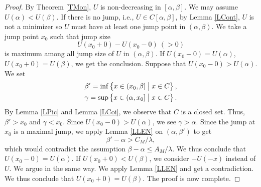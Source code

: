 \documentclass[11pt]{amsart} %
\numberwithin{equation}{section}
\begin{document}
\begin{proof}
By Theorem \ref{TMon}, $U$ is non-decreasing in $[\alpha,\beta]$.
 We may assume $U(\alpha)<U(\beta)$.
 If there is no jump, i.e., $U\in C[\alpha,\beta]$, by Lemma \ref{LCont}, $U$ is not a minimizer so $U$ must have at least one jump point in $(\alpha,\beta)$.
 We take a jump point $x_0$ such that jump size
\[
	U(x_0+0) - U(x_0-0)\ (>0)
\]
is maximum among all jump size of $U$ in $(\alpha,\beta)$.
 If $U(x_0-0)=U(\alpha)$, $U(x_0+0)=U(\beta)$, we get the conclusion.
 Suppose that $U(x_0-0)>U(\alpha)$.
 We set
\begin{gather*} %
	\beta' = \inf \left\{ x \in (x_0,\beta] \bigm| x \in C \right\}, \\
	\gamma = \sup \left\{ x \in (\alpha,x_0] \bigm| x \in C \right\}.
\end{gather*}
By Lemma \ref{LPic} and Lemma \ref{LCoi}, we observe that $C$ is a closed set.
 Thus, $\beta'>x_0$ and $\gamma<x_0$.
 Since $U(x_0-0)>U(\alpha)$, we see $\gamma>\alpha$.
 Since the jump at $x_0$ is a maximal jump, we apply Lemma \ref{LLEN} on $(\alpha,\beta')$ to get
\[
	\beta' - \alpha > C_M/\lambda,
\]
which would contradict the assumption $\beta-\alpha\le A_M/\lambda$.
 We thus conclude that $U(x_0-0)=U(\alpha)$.
 If $U(x_0+0)<U(\beta)$, we consider $-U(-x)$ instead of $U$.
 We argue in the same way.
 We apply Lemma \ref{LLEN} and get a contradiction.
 We thus conclude that $U(x_0+0)=U(\beta)$.
 The proof is now complete.
\end{proof}
%
\end{document}
